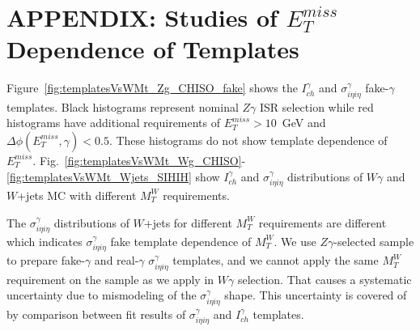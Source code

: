 \chapter{APPENDIX: Studies of $E_T^{miss}$ Dependence of Templates}
\label{sec:CompareTemplatesPlots}

Figure~\ref{fig:templatesVsWMt_Zg_CHISO_fake} shows the $I_{ch}^{\gamma}$ and $\sigma_{i\eta i\eta}^{\gamma}$ fake-$\gamma$ templates. Black histograms represent nominal $Z\gamma$ ISR selection while red histograms have additional requirements of $E_T^{miss}>10$~GeV and $\Delta \phi(E_T^{miss},\gamma)<0.5$. These histograms do not show template dependence of $E_T^{miss}$. Fig.~\ref{fig:templatesVsWMt_Wg_CHISO}-\ref{fig:templatesVsWMt_Wjets_SIHIH} show $I_{ch}^\gamma$ and $\sigma_{i \eta i \eta}^{\gamma}$ distributions of $W\gamma$ and $W$+jets MC with different $M_T^W$ requirements. 

The $\sigma_{i \eta i \eta}^\gamma$ distributions of $W$+jets for different $M_T^W$ requirements are different which indicates $\sigma_{i \eta i\eta}^\gamma$ fake template dependence of $M_T^W$. We use $Z\gamma$-selected sample to prepare fake-$\gamma$ and real-$\gamma$ $\sigma_{i \eta i \eta}^\gamma$ templates, and we cannot apply the same $M_T^W$ requirement on the sample as we apply in $W\gamma$ selection. That causes a systematic uncertainty due to mismodeling of the $\sigma_{i \eta i \eta}^{\gamma}$ shape. This uncertainty is covered of by comparison between fit results of $\sigma_{i \eta i \eta}^{\gamma}$ and $I_{ch}^\gamma$ templates.

